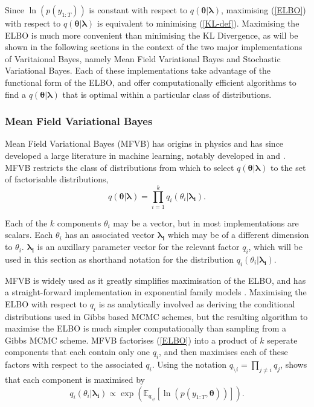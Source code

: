 \documentclass[12pt,a4paper]{article}%
\numberwithin{equation}{section}
\begin{document}
Since $\ln(p(y_{1:T}))$ is constant with respect to $q(\boldsymbol{\theta} | \boldsymbol{\lambda})$, maximising (\ref{ELBO}) with respect to $q(\boldsymbol{\theta} | \boldsymbol{\lambda})$ is equivalent to minimising (\ref{KL-def}). Maximising the ELBO is much more convenient than minimising the KL Divergence, as will be shown in the following sections in the context of the two major implementations of Varitaional Bayes, namely Mean Field Variational Bayes and Stochastic Variational Bayes. Each of these implementations take advantage of the functional form of the ELBO, and offer computationally efficient algorithms to find a $q(\boldsymbol{\theta} | \boldsymbol{\lambda})$ that is optimal within a particular class of distributions. 

\subsubsection{Mean Field Variational Bayes} \label{sec:mfvb}

Mean Field Variational Bayes (MFVB) has origins in physics \citep{Chandler1987} and has since developed a large literature in machine learning, notably developed in \citet{Jordan1999} and \citet{Beal2003}. MFVB restricts the class of distributions from which to select $q(\boldsymbol{\theta} | \boldsymbol{\lambda})$ to the set of factorisable distributions,
\begin{equation}
\label{mf1}
q(\boldsymbol{\theta} | \boldsymbol{\lambda}) = \prod_{i=1}^k q_i(\theta_i | \boldsymbol{\lambda_i}).
\end{equation}

Each of the $k$ components $\theta_i$ may be a vector, but in most implementations are scalars. Each $\theta_i$ has an associated vector $\boldsymbol{\lambda_i}$ which may be of a different dimension to $\theta_i$. $\boldsymbol{\lambda_i}$ is an auxillary parameter vector for the relevant factor $q_i$, which will be used in this section as shorthand notation for the distribution $q_i(\theta_i |\boldsymbol{\lambda_i})$. 

MFVB is widely used as it greatly simplifies maximisation of the ELBO, and has a straight-forward implementation in exponential family models \citep{Wainwright2008}.  Maximising the ELBO with respect to $q_i$ is as analytically involved as deriving the conditional distributions used in Gibbs based MCMC schemes, but the resulting algorithm to maximise the ELBO is much simpler computationally than sampling from a Gibbs MCMC scheme. MFVB factorises (\ref{ELBO}) into a product of $k$ seperate components that each contain only one $q_i$, and then maximises each of these factors with respect to the associated $q_i$. Using the notation $q_{\setminus i} = \prod_{j\neq i}q_j$, \citet{Attias1999} shows that each component is maximised by
\begin{equation}
\label{mf2}
q_i(\theta_i |\boldsymbol{\lambda_i}) \propto\exp( \mathbb{E}_{q_{\setminus i}} [\ln(p(y_{1:T},\boldsymbol{\theta}))]).
\end{equation}
\end{document}
